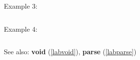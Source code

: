 \noindent Example 3: 
\begin{center}\begin{minipage}{15cm}\begin{Verbatim}[frame=single]
\end{Verbatim}
\end{minipage}\end{center}
\noindent Example 4: 
\begin{center}\begin{minipage}{15cm}\begin{Verbatim}[frame=single]
\end{Verbatim}
\end{minipage}\end{center}
See also: \textbf{void} (\ref{labvoid}), \textbf{parse} (\ref{labparse})
